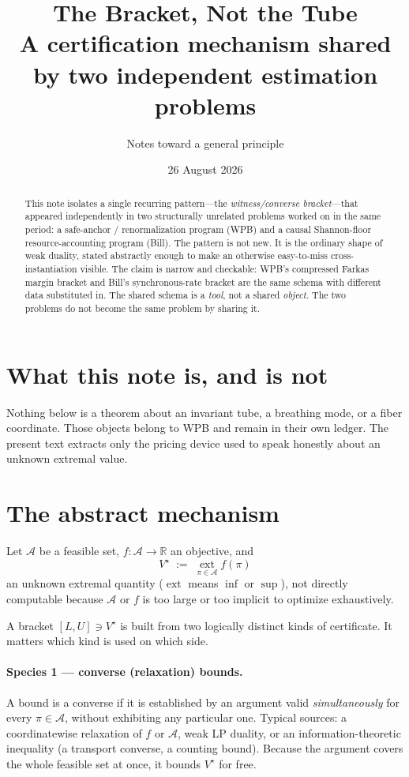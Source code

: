 \documentclass[11pt,a4paper]{article}
\title{\textbf{The Bracket, Not the Tube}\\[0.4em]
\large A certification mechanism shared by two independent estimation problems}
\author{Notes toward a general principle}
\date{26 August 2026}
\newcommand{\Acal}{\mathcal{A}}
\begin{document}
\maketitle

\begin{abstract}
\noindent
This note isolates a single recurring pattern---the \emph{witness/converse bracket}---that appeared independently in two structurally unrelated problems worked on in the same period: a safe-anchor / renormalization program (WPB) and a causal Shannon-floor resource-accounting program (Bill). The pattern is not new. It is the ordinary shape of weak duality, stated abstractly enough to make an otherwise easy-to-miss cross-instantiation visible. The claim is narrow and checkable: WPB's compressed Farkas margin bracket and Bill's synchronous-rate bracket are the same schema with different data substituted in. The shared schema is a \emph{tool}, not a shared \emph{object}. The two problems do not become the same problem by sharing it.
\end{abstract}

\section{What this note is, and is not}

Nothing below is a theorem about an invariant tube, a breathing mode, or a fiber coordinate. Those objects belong to WPB and remain in their own ledger. The present text extracts only the pricing device used to speak honestly about an unknown extremal value.

\section{The abstract mechanism}

Let \(\Acal\) be a feasible set, \(f:\Acal\to\mathbb{R}\) an objective, and
\begin{equation}
  V^\star \;:=\; \operatorname*{ext}_{\pi\in\Acal} f(\pi)
\end{equation}
an unknown extremal quantity (\(\operatorname{ext}\) means \(\inf\) or \(\sup\)), not directly computable because \(\Acal\) or \(f\) is too large or too implicit to optimize exhaustively.

A bracket \([L,U]\ni V^\star\) is built from two logically distinct kinds of certificate. It matters which kind is used on which side.

\paragraph{Species 1 --- converse (relaxation) bounds.}
A bound is a converse if it is established by an argument valid \emph{simultaneously} for every \(\pi\in\Acal\), without exhibiting any particular one. Typical sources: a coordinatewise relaxation of \(f\) or \(\Acal\), weak LP duality, or an information-theoretic inequality (a transport converse, a counting bound). Because the argument covers the whole feasible set at once, it bounds \(V^\star\) for free.
\end{document}
